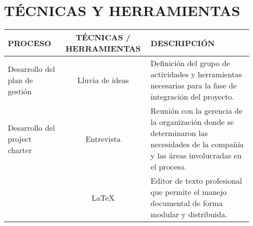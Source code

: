 \chapter{T\'ECNICAS Y HERRAMIENTAS}
%
\begin{table}[H]
	\centering
	\begin{tabular}{| m{5cm} | c | p{5cm} |}
	\hline
	\textbf{PROCESO} & \textbf{T\'ECNICAS / HERRAMIENTAS} & \textbf{DESCRIPCI\'ON} \\ \hline
	Desarrollo del plan de gesti\'on & Lluvia de ideas & Definici\'on del grupo de actividades y herramientas 
	necesarias para la fase de integraci\'on del proyecto.\\
	\hline
	Desarrollo del project charter & Entrevista & Reuni\'on con la gerencia de la organizaci\'on
	donde se determinaron las necesidades de la compa\~n\'ia y las \'areas involucradas en el proceso. \\ 
	  \cline{2-3}
	 & \LaTeX & Editor de texto profesional que permite el manejo documental de forma modular y distribuida. \\
	\hline
	\end{tabular}
\end{table}